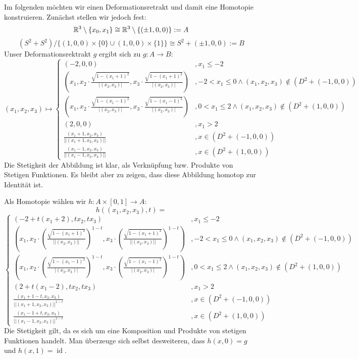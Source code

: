 \documentclass{scrartcl}
\newcommand{\id}{\operatorname{id}}
\begin{document}
\begin{aufgabe}
Im folgenden möchten wir einen Deformationsretrakt und damit eine Homotopie konstruieren.  Zunächst stellen wir jedoch fest:
\[
\mathbb{R}^3\setminus\{x_0, x_1\}\cong \mathbb{R}^3\setminus\{(\pm 1, 0, 0)\}:=A
\]
\[
(S^2+S^2)/\{(1,0,0)\times\{0\}\cup (1,0,0)\times \{1\}\} \cong S^2+(\pm1,0,0):=B 
\]
Unser Deformationsrektrakt $ g $ ergibt sich zu $ g: A \to B: $
\[
 (x_1, x_2, x_3) \mapsto \begin{cases} (-2,0,0) &, x_1 \le -2\\ (x_1, x_2\cdot \frac{\sqrt{1-(x_1+1)^2}}{|(x_2,x_3)|}, x_3 \cdot \frac{\sqrt{1-(x_1+1)^2}}{ |(x_2,x_3)|}) &,  -2 < x_1\le 0 \land (x_1,x_2,x_3)\notin (D^2+(-1,0,0)) \\(x_1, x_2\cdot \frac{\sqrt{1-(x_1-1)^2}}{|(x_2,x_3)|}, x_3 \cdot \frac{\sqrt{1-(x_1-1)^2}}{ |(x_2,x_3)|}) &, 0 < x_1 \le 2 \land (x_1, x_2, x_3) \notin (D^2+(1,0,0)) \\(2,0,0) &, x_1>2 \\ \frac{(x_1+1,x_2,x_3)}{||(x_1+1,x_2,x_3)||} &, x\in (D^2+(-1,0,0)) \\ \frac{(x_1-1, x_2, x_3)}{||(x_1-1,x_2,x_3)||} &, x\in (D^2+(1,0,0))    \end{cases}
\]
Die Stetigkeit der Abbildung ist klar, als Verknüpfung bzw. Produkte von Stetigen Funktionen. Es bleibt aber zu zeigen, dass diese Abbildung homotop zur Identität ist.

Als Homotopie wählen wir $ h: A \times [0,1] \to A $:
\[
 h((x_1,x_2,x_3), t)=
 \]
 \[ \begin{cases} (-2+t(x_1+2),tx_2,tx_3) &, x_1 \le -2\\ (x_1, x_2\cdot \left (\frac{\sqrt{1-(x_1+1)^2}}{||(x_2,x_3)||}\right )^{1-t}, x_3 \cdot \left (\frac{\sqrt{1-(x_1+1)^2}}{ ||(x_2,x_3)||}\right )^{1-t}) &,  -2 < x_1\le 0 \land (x_1,x_2,x_3)\notin (D^2+(-1,0,0)) \\(x_1, x_2\cdot \left (\frac{\sqrt{1-(x_1-1)^2}}{|(x_2,x_3)|}\right )^{1-t}, x_3 \cdot \left (\frac{\sqrt{1-(x_1-1)^2}}{ |(x_2,x_3)|}\right )^{1-t}) &, 0 < x_1 \le 2 \land (x_1, x_2, x_3) \notin (D^2+(1,0,0)) \\(2+t(x_1-2),tx_2,tx_3) &, x_1>2 \\ \frac{(x_1+1-t,x_2,x_3)}{||(x_1+1,x_2,x_3)||^{1-t}} &, x\in (D^2+(-1,0,0)) \\ \frac{(x_1-1+t, x_2, x_3)}{||(x_1-1,x_2,x_3)||^{1-t}} &, x\in (D^2+(1,0,0))    \end{cases}
\]
Die Stetigkeit gilt, da es sich um eine Komposition und Produkte von stetigen Funktionen handelt. Man überzeuge sich selbst desweiteren, dass $h(x,0)=g$ und $h(x,1)=\id$.
\end{aufgabe}
\end{document}
